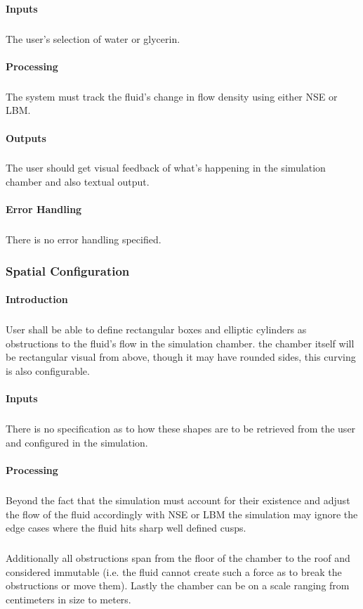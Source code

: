 \documentclass{scrartcl}
\begin{document}
\paragraph{Inputs}
\subparagraph{}
The user’s selection of water or glycerin. 

\paragraph{Processing}
\subparagraph{}
The system must track the fluid’s change in flow density using either NSE or LBM. 

\paragraph{Outputs}
\subparagraph{}
The user should get visual feedback of what’s happening in the simulation chamber and also textual output.

\paragraph{Error Handling}
\subparagraph{}
There is no error handling specified.

\subsubsection{Spatial Configuration}
\paragraph{Introduction}
\subparagraph{}
User shall be able to define rectangular boxes and elliptic cylinders as obstructions to the fluid’s flow in the simulation chamber. the chamber itself will be rectangular visual from above, though it may have rounded sides, this curving is also configurable. 

\paragraph{Inputs}
\subparagraph{}
There is no specification as to how these shapes are to be retrieved from the user and configured in the simulation. 

\paragraph{Processing}
\subparagraph{}
Beyond the fact that the simulation must account for their existence and adjust the flow of the fluid accordingly with NSE or LBM the simulation may ignore the edge cases where the fluid hits sharp well defined cusps. 
\subparagraph{}
Additionally all obstructions span from the floor of the chamber to the roof and considered immutable (i.e. the fluid cannot create such a force as to break the obstructions or move them). 
Lastly the chamber can be on a scale ranging from centimeters in size to meters. 
\end{document}

